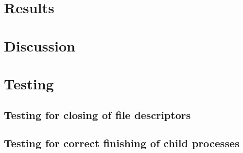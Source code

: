 \documentclass[a4paper,11pt,twoside]{article}
\begin{document}
\section{Results}

\section{Discussion}

\section{Testing}

\subsection{Testing for closing of file descriptors}

\subsection{Testing for correct finishing of child processes}



\end{document}
